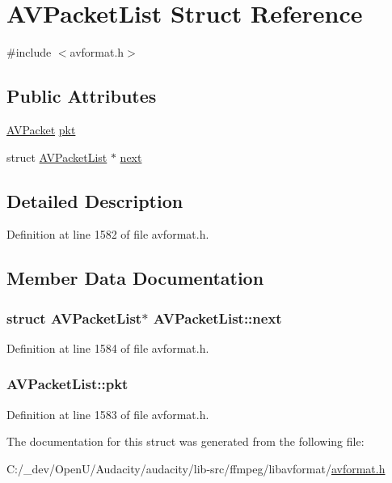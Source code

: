 \hypertarget{struct_a_v_packet_list}{}\section{A\+V\+Packet\+List Struct Reference}
\label{struct_a_v_packet_list}


{\ttfamily \#include $<$avformat.\+h$>$}

\subsection*{Public Attributes}
\begin{DoxyCompactItemize}
\item 
\hyperlink{struct_a_v_packet}{A\+V\+Packet} \hyperlink{struct_a_v_packet_list_a2d7ef80c60c0c3a804248ab691b9c5a7}{pkt}
\item 
struct \hyperlink{struct_a_v_packet_list}{A\+V\+Packet\+List} $\ast$ \hyperlink{struct_a_v_packet_list_a6a1d0f1a75cfafa4643b93752edef643}{next}
\end{DoxyCompactItemize}


\subsection{Detailed Description}


Definition at line 1582 of file avformat.\+h.



\subsection{Member Data Documentation}
\subsubsection[{\texorpdfstring{next}{next}}]{\setlength{\rightskip}{0pt plus 5cm}struct {\bf A\+V\+Packet\+List}$\ast$ A\+V\+Packet\+List\+::next}\hypertarget{struct_a_v_packet_list_a6a1d0f1a75cfafa4643b93752edef643}{}\label{struct_a_v_packet_list_a6a1d0f1a75cfafa4643b93752edef643}


Definition at line 1584 of file avformat.\+h.

\subsubsection[{\texorpdfstring{pkt}{pkt}}]{ A\+V\+Packet\+List\+::pkt}\hypertarget{struct_a_v_packet_list_a2d7ef80c60c0c3a804248ab691b9c5a7}{}\label{struct_a_v_packet_list_a2d7ef80c60c0c3a804248ab691b9c5a7}


Definition at line 1583 of file avformat.\+h.



The documentation for this struct was generated from the following file\+:\begin{DoxyCompactItemize}
\item 
C\+:/\+\_\+dev/\+Open\+U/\+Audacity/audacity/lib-\/src/ffmpeg/libavformat/\hyperlink{avformat_8h}{avformat.\+h}\end{DoxyCompactItemize}
